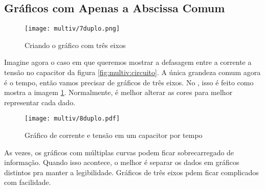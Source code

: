 \subsection{Gráficos com Apenas a Abscissa Comum}

    \begin{figure}[htbp]
        \centering
        \texttt{[image: multiv/7duplo.png]}

        \caption{Criando o gráfico com três eixos}
        \label{fig:multiv:duplo:tutorial}
    \end{figure}

    Imagine agora o caso em que queremos mostrar a defasagem entre a corrente a tensão no capacitor da figura \ref{fig:multiv:circuito}. A única grandeza comum agora é o tempo, então vamos precisar de gráficos de três eixos. No \software, isso é feito como mostra a imagem \ref{fig:multiv:duplo:tutorial}. Normalmente, é melhor alterar as cores para melhor representar cada dado.

    \begin{figure}[htbp]
        \centering
        \texttt{[image: multiv/8duplo.pdf]}

        \caption{Gráfico de corrente e tensão em um capacitor por tempo}
        \label{fig:multiv:duplo}
    \end{figure}

    \begin{nota}
        As vezes, os gráficos com múltiplas curvas podem ficar sobrecarregado de informação. Quando isso acontece, o melhor é separar os dados em gráficos distintos pra manter a legibilidade. Gráficos de três eixos pdem ficar complicados com facilidade.
    \end{nota}
